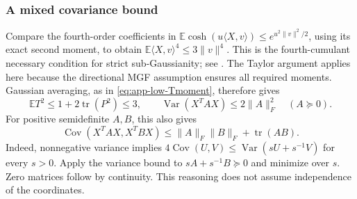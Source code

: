 \documentclass[11pt,a4paper]{article}
\numberwithin{equation}{section}
\begin{document}
\subsubsection{A mixed covariance bound}
Compare the fourth-order coefficients in
$\mathbb E\cosh(u\langle X,v\rangle)\le e^{u^2\|v\|^2/2}$,
using its exact second moment, to obtain
$\mathbb E\langle X,v\rangle^4\le3\|v\|^4$.
This is the fourth-cumulant necessary condition for strict
sub-Gaussianity; see \cite[Proposition~3.2]{arbel2020strict}.
The Taylor argument applies here because the directional MGF assumption
ensures all required moments.
Gaussian averaging, as in \eqref{eq:app-low-Tmoment}, therefore gives
\[
 \mathbb ET^2\le1+2\operatorname{tr}(P^2)\le3,
 \qquad
 \operatorname{Var}(X^TAX)\le2\|A\|_F^2\quad(A\succeq0).
\]
For positive semidefinite $A,B$, this also gives
\begin{equation}\label{eq:app-K-one-covariance}
 \operatorname{Cov}(X^TAX,X^TBX)
 \le\|A\|_F\|B\|_F+\operatorname{tr}(AB).
\end{equation}
Indeed, nonnegative variance implies
$4\operatorname{Cov}(U,V)\le\operatorname{Var}(sU+s^{-1}V)$
for every $s>0$. Apply the variance bound to
$sA+s^{-1}B\succeq0$ and minimize over $s$.
Zero matrices follow by continuity.
This reasoning does not assume independence of the coordinates.
\end{document}

